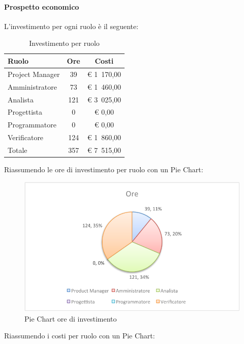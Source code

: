 			\paragraph{Prospetto economico}
				L'investimento per ogni ruolo è il seguente:
				\begin{table}[H]
					\begin{center}
						\begin{tabular}{| l | c | c |}
							\hline
							Ruolo 			& Ore 		& Costi  \\ \hline
							
							Project Manager	& 39 		& \euro{} 1~170,00 	\\
							Amministratore 		& 73 		& \euro{} 1~460,00 	\\
							Analista	 		& 121 	& \euro{} 3~025,00 	\\
							Progettista 		& 0		& \euro{} 0,00 	\\
							Programmatore		& 0		& \euro{} 0,00	\\
							Verificatore		& 124 	& \euro{} 1~860,00 	\\ \hline \hline
							
							Totale	 		& 357 	& \euro{} 7~515,00 	\\ \hline
						\end{tabular}
					\end{center}
					\caption{Investimento per ruolo}
				\end{table}
				Riassumendo le ore di investimento per ruolo con un Pie Chart:
				\begin{figure}[H]\centering
					\includegraphics[width=\textwidth]{PianoDiProgetto/Pics/ChartTotOreInvest.pdf}
					\caption{Pie Chart ore di investimento}
				\end{figure}
				Riassumendo i costi per ruolo con un Pie Chart:
